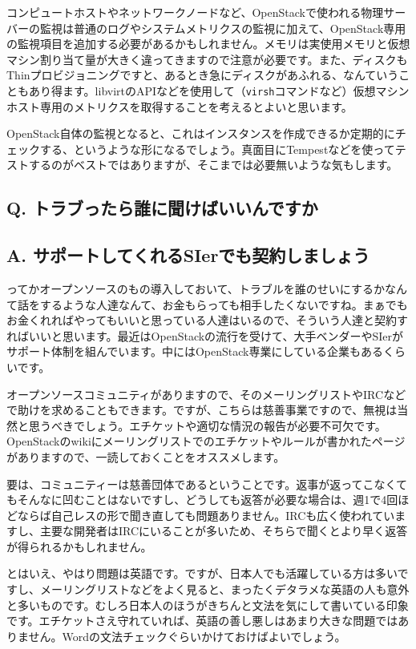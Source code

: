 \documentclass[9pt,b5paper,tombo,openany]{jsbook}
\begin{document}
コンピュートホストやネットワークノードなど、OpenStackで使われる物理サーバーの監視は普通のログやシステムメトリクスの監視に加えて、OpenStack専用の監視項目を追加する必要があるかもしれません。メモリは実使用メモリと仮想マシン割り当て量が大きく違ってきますので注意が必要です。また、ディスクもThinプロビジョニングですと、あるとき急にディスクがあふれる、なんていうこともあり得ます。libvirtのAPIなどを使用して（\verb|virsh|コマンドなど）仮想マシンホスト専用のメトリクスを取得することを考えるとよいと思います。

OpenStack自体の監視となると、これはインスタンスを作成できるか定期的にチェックする、というような形になるでしょう。真面目にTempestなどを使ってテストするのがベストではありますが、そこまでは必要無いような気もします。

\subsection*{{\LARGE\bfseries Q.} トラブったら誰に聞けばいいんですか}
\subsection*{{\LARGE\bfseries A.} サポートしてくれるSIerでも契約しましょう}
ってかオープンソースのもの導入しておいて、トラブルを誰のせいにするかなんて話をするような人達なんて、お金もらっても相手したくないですね。まぁでもお金くれればやってもいいと思っている人達はいるので、そういう人達と契約すればいいと思います。最近はOpenStackの流行を受けて、大手ベンダーやSIerがサポート体制を組んでいます。中にはOpenStack専業にしている企業もあるくらいです。

オープンソースコミュニティがありますので、そのメーリングリストやIRCなどで助けを求めることもできます。ですが、こちらは慈善事業ですので、無視は当然と思うべきでしょう。エチケットや適切な情況の報告が必要不可欠です。OpenStackのwikiにメーリングリストでのエチケットやルールが書かれたページがありますので、一読しておくことをオススメします。

要は、コミュニティーは慈善団体であるということです。返事が返ってこなくてもそんなに凹むことはないですし、どうしても返答が必要な場合は、週1で4回ほどならば自己レスの形で聞き直しても問題ありません。IRCも広く使われていますし、主要な開発者はIRCにいることが多いため、そちらで聞くとより早く返答が得られるかもしれません。

とはいえ、やはり問題は英語です。ですが、日本人でも活躍している方は多いですし、メーリングリストなどをよく見ると、まったくデタラメな英語の人も意外と多いものです。むしろ日本人のほうがきちんと文法を気にして書いている印象です。エチケットさえ守れていれば、英語の善し悪しはあまり大きな問題ではありません。Wordの文法チェックぐらいかけておけばよいでしょう。
\end{document}
